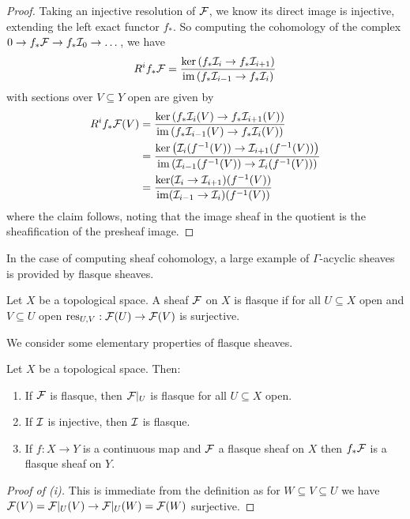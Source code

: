 \begin{proof}
    Taking an injective resolution of $\mathcal{F}$, we know its direct image is injective, extending the left exact functor $f_{*}$. So computing the cohomology of the complex $0\to f_{*}\mathcal{F}\to f_{*}\mathcal{I}_{0}\to\dots$, we have 
    $$R^{i}f_{*}\mathcal{F}=\frac{\ker\left(f_{*}\mathcal{I}_{i}\to f_{*}\mathcal{I}_{i+1}\right)}{\mathrm{im}\left(f_{*}\mathcal{I}_{i-1}\to f_{*}\mathcal{I}_{i}\right)}$$
    with sections over $V\subseteq Y$ open are given by
    \begin{align*}
        R^{i}f_{*}\mathcal{F}(V) &= \frac{\ker\left(f_{*}\mathcal{I}_{i}(V)\to f_{*}\mathcal{I}_{i+1}(V)\right)}{\mathrm{im}\left(f_{*}\mathcal{I}_{i-1}(V)\to f_{*}\mathcal{I}_{i}(V)\right)}\\
        &=\frac{\ker\left(\mathcal{I}_{i}(f^{-1}(V))\to \mathcal{I}_{i+1}(f^{-1}(V))\right)}{\mathrm{im}\left(\mathcal{I}_{i-1}(f^{-1}(V))\to \mathcal{I}_{i}(f^{-1}(V))\right)} \\
        &= \frac{\ker(\mathcal{I}_{i}\to\mathcal{I}_{i+1})(f^{-1}(V))}{\mathrm{im}(\mathcal{I}_{i-1}\to\mathcal{I}_{i})(f^{-1}(V))}
    \end{align*} 
    where the claim follows, noting that the image sheaf in the quotient is the sheafification of the presheaf image. 
\end{proof}
In the case of computing sheaf cohomology, a large example of $\Gamma$-acyclic sheaves is provided by flasque sheaves. 
\begin{definition}\label{def: flasque sheaf}
    Let $X$ be a topological space. A sheaf $\mathcal{F}$ on $X$ is flasque if for all $U\subseteq X$ open and $V\subseteq U$ open $\mathrm{res}_{U,V}:\mathcal{F}(U)\to\mathcal{F}(V)$ is surjective. 
\end{definition}
We consider some elementary properties of flasque sheaves. 
\begin{proposition}\label{prop: properties of flasque sheaves}
    Let $X$ be a topological space. Then:
    \begin{enumerate}[label=(\roman*)]
        \item If $\mathcal{F}$ is flasque, then $\mathcal{F}|_{U}$ is flasque for all $U\subseteq X$ open. 
        \item If $\mathcal{I}$ is injective, then $\mathcal{I}$ is flasque. 
        \item If $f:X\to Y$ is a continuous map and $\mathcal{F}$ a flasque sheaf on $X$ then $f_{*}\mathcal{F}$ is a flasque sheaf on $Y$. 
    \end{enumerate}
\end{proposition}
\begin{proof}[Proof of (i)]
    This is immediate from the definition as for $W\subseteq V\subseteq U$ we have $\mathcal{F}(V)=\mathcal{F}|_{U}(V)\to\mathcal{F}|_{U}(W)=\mathcal{F}(W)$ surjective. 
\end{proof}
